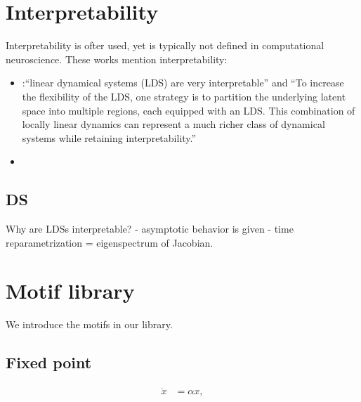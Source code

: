 \documentclass{article}
\theoremstyle{definition} \newtheorem{definition}{Definition}  \newtheorem{example}{Example}
\theoremstyle{remark} \newtheorem{remark}{Remark}
\newcounter{ct}
\begin{document}
\newpage
\section{Interpretability}
Interpretability is ofter used, yet is typically not defined in computational neuroscience\citep{Zhao2016d, duncker2019learning}.
%
These works mention interpretability:
\begin{itemize}
\item \citet{Nassar2018b}:``linear dynamical systems (LDS) are very interpretable'' and  ``To increase the flexibility of the LDS, one strategy is to partition the underlying latent space into multiple regions, each equipped with an LDS. This combination of locally linear dynamics can represent a much richer class of dynamical systems while retaining interpretability.'' 
\item 
\end{itemize}

\subsection{DS}
Why are LDSs interpretable?
- asymptotic behavior is given
- time reparametrization = eigenspectrum of Jacobian.

%






\newpage
\section{Motif library}\label{sec:library}
We introduce the motifs in our library.

\subsection{Fixed point}\label{sec:fp}
\[
\begin{aligned}
\dot{x} &= \alpha x, \\
\end{aligned}
\]
\end{document}
